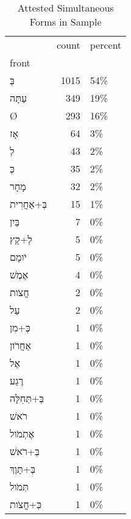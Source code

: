 \begin{table}[htbp!]
\centering
\caption{Attested Simultaneous Forms in Sample}
\label{table:sim_front}
\begin{tabular}{lrl}
\toprule
{} &  count & percent \\
front                      &        &         \\
\midrule
\texthebrew{בְּ}           &   1015 &     54\% \\
\texthebrew{עַתָּה}        &    349 &     19\% \\
\texthebrew{Ø}             &    293 &     16\% \\
\texthebrew{אָז}           &     64 &      3\% \\
\texthebrew{לְ}            &     43 &      2\% \\
\texthebrew{כְּ}           &     35 &      2\% \\
\texthebrew{מָחָר}         &     32 &      2\% \\
\texthebrew{בְּ+אַחֲרִית}  &     15 &      1\% \\
\texthebrew{בַּיִן}        &      7 &      0\% \\
\texthebrew{לְ+קֵץ}        &      5 &      0\% \\
\texthebrew{יֹומָם}        &      5 &      0\% \\
\texthebrew{אֶמֶשׁ}        &      4 &      0\% \\
\texthebrew{חֲצֹות}        &      2 &      0\% \\
\texthebrew{עַל}           &      2 &      0\% \\
\texthebrew{כְּ+מִן}       &      1 &      0\% \\
\texthebrew{אַחֲרֹון}      &      1 &      0\% \\
\texthebrew{אֶל}           &      1 &      0\% \\
\texthebrew{רֶגַע}         &      1 &      0\% \\
\texthebrew{בְּ+תְּחִלָּה} &      1 &      0\% \\
\texthebrew{רֹאשׁ}         &      1 &      0\% \\
\texthebrew{אֶתְמֹול}      &      1 &      0\% \\
\texthebrew{בְּ+רֹאשׁ}     &      1 &      0\% \\
\texthebrew{בְּ+תָּוֶךְ}   &      1 &      0\% \\
\texthebrew{תְּמֹול}       &      1 &      0\% \\
\texthebrew{כְּ+חֲצֹות}    &      1 &      0\% \\
\bottomrule
\end{tabular}
\end{table}
